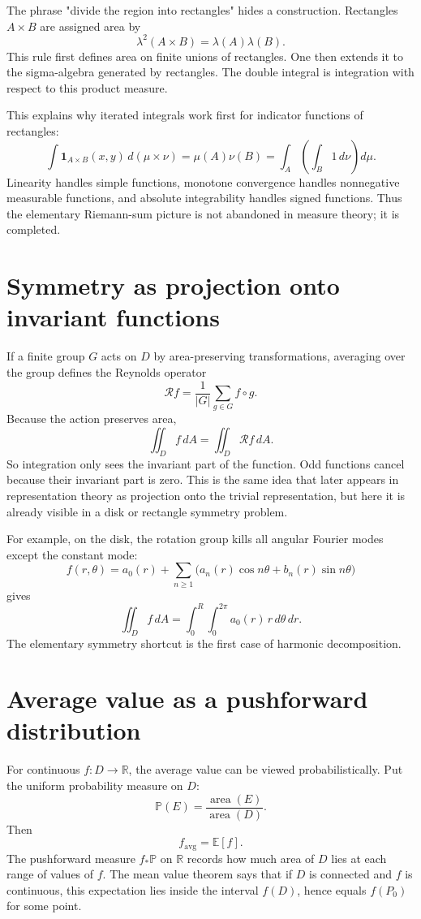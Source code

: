 The phrase "divide the region into rectangles" hides a construction.  Rectangles \(A\times B\) are assigned area by
\[
  \lambda^2(A\times B)=\lambda(A)\lambda(B).
\]
This rule first defines area on finite unions of rectangles.  One then extends it to the sigma-algebra generated by rectangles.  The double integral is integration with respect to this product measure.

This explains why iterated integrals work first for indicator functions of rectangles:
\[
  \int \mathbf 1_{A\times B}(x,y)\,d(\mu\times\nu)
  =\mu(A)\nu(B)
  =\int_A\left(\int_B1\,d\nu\right)d\mu.
\]
Linearity handles simple functions, monotone convergence handles nonnegative measurable functions, and absolute integrability handles signed functions.  Thus the elementary Riemann-sum picture is not abandoned in measure theory; it is completed.

\section{Symmetry as projection onto invariant functions}

If a finite group \(G\) acts on \(D\) by area-preserving transformations, averaging over the group defines the Reynolds operator
\[
  \mathcal R f=\frac{1}{|G|}\sum_{g\in G} f\circ g.
\]
Because the action preserves area,
\[
  \iint_D f\,dA=\iint_D \mathcal R f\,dA.
\]
So integration only sees the invariant part of the function.  Odd functions cancel because their invariant part is zero.  This is the same idea that later appears in representation theory as projection onto the trivial representation, but here it is already visible in a disk or rectangle symmetry problem.

For example, on the disk, the rotation group kills all angular Fourier modes except the constant mode:
\[
  f(r,\theta)=a_0(r)+\sum_{n\ge1}\bigl(a_n(r)\cos n\theta+b_n(r)\sin n\theta\bigr)
\]
gives
\[
  \iint_D f\,dA=\int_0^R\int_0^{2\pi} a_0(r)\,r\,d\theta\,dr.
\]
The elementary symmetry shortcut is the first case of harmonic decomposition.

\section{Average value as a pushforward distribution}

For continuous \(f:D\to\mathbb R\), the average value can be viewed probabilistically.  Put the uniform probability measure on \(D\):
\[
  \mathbb P(E)=\frac{\operatorname{area}(E)}{\operatorname{area}(D)}.
\]
Then
\[
  f_{\mathrm{avg}}=\mathbb E[f].
\]
The pushforward measure \(f_*\mathbb P\) on \(\mathbb R\) records how much area of \(D\) lies at each range of values of \(f\).  The mean value theorem says that if \(D\) is connected and \(f\) is continuous, this expectation lies inside the interval \(f(D)\), hence equals \(f(P_0)\) for some point.

